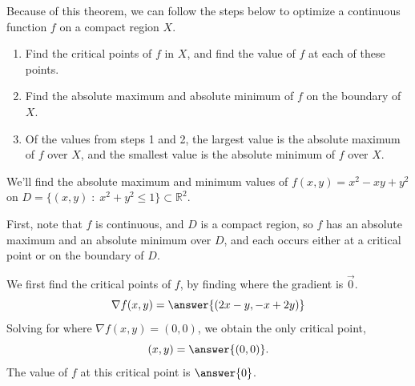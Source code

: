 \documentclass{ximera}
\begin{document}
Because of this theorem, we can follow the steps below to optimize a continuous function $f$ on a compact region $X$.
\begin{enumerate}
\item Find the critical points of $f$ in $X$, and find the value of $f$ at each of these points.
\item Find the absolute maximum and absolute minimum of $f$ on the boundary of $X$.
\item Of the values from steps 1 and 2, the largest value is the absolute maximum of $f$ over $X$, and the smallest value is the absolute minimum of $f$ over $X$.
\end{enumerate}

\begin{example}
We'll find the absolute maximum and minimum values of $f(x,y)= x^2-xy+y^2$ on $D=\{(x,y)\;:\;x^2+y^2\leq 1\}\subset \mathbb{R}^2$.

\begin{image}
\end{image}

First, note that $f$ is continuous, and $D$ is a compact region, so $f$ has an absolute maximum and an absolute minimum over $D$, and each occurs either at a critical point or on the boundary of $D$.

We first find the critical points of $f$, by finding where the gradient is $\vec{0}$.
\[
\nabla f(x,y) = \answer{(2x-y, -x+2y)}
\]
Solving for where $\nabla f(x,y) = (0,0)$, we obtain the only critical point,
\[
(x,y) = \answer{(0,0)}.
\]
The value of $f$ at this critical point is $\answer{0}$.


\end{example}
\end{document}
